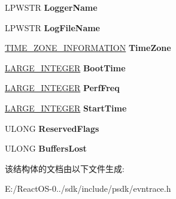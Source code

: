 \begin{DoxyCompactItemize}
\begin{tabbing}
\end{tabbing}\item 
\mbox{\label{struct___t_r_a_c_e___l_o_g_f_i_l_e___h_e_a_d_e_r_adf44a7376b387e730774a45c3e93b437}} 
L\+P\+W\+S\+TR {\bfseries Logger\+Name}
\item 
\mbox{\label{struct___t_r_a_c_e___l_o_g_f_i_l_e___h_e_a_d_e_r_a76705c979d1326fc2b29dad5ba0ca5b6}} 
L\+P\+W\+S\+TR {\bfseries Log\+File\+Name}
\item 
\mbox{\label{struct___t_r_a_c_e___l_o_g_f_i_l_e___h_e_a_d_e_r_ac1ae267367d54f3b047e0cf62a1003e8}} 
\hyperlink{struct___t_i_m_e___z_o_n_e___i_n_f_o_r_m_a_t_i_o_n}{T\+I\+M\+E\+\_\+\+Z\+O\+N\+E\+\_\+\+I\+N\+F\+O\+R\+M\+A\+T\+I\+ON} {\bfseries Time\+Zone}
\item 
\mbox{\label{struct___t_r_a_c_e___l_o_g_f_i_l_e___h_e_a_d_e_r_a8cb4f4830f0569a10a9960ad1a7694b6}} 
\hyperlink{union___l_a_r_g_e___i_n_t_e_g_e_r}{L\+A\+R\+G\+E\+\_\+\+I\+N\+T\+E\+G\+ER} {\bfseries Boot\+Time}
\item 
\mbox{\label{struct___t_r_a_c_e___l_o_g_f_i_l_e___h_e_a_d_e_r_ae0b72b8e15ddf0937a2b42596de884f3}} 
\hyperlink{union___l_a_r_g_e___i_n_t_e_g_e_r}{L\+A\+R\+G\+E\+\_\+\+I\+N\+T\+E\+G\+ER} {\bfseries Perf\+Freq}
\item 
\mbox{\label{struct___t_r_a_c_e___l_o_g_f_i_l_e___h_e_a_d_e_r_a52e93aa9d4f379899235d2933a02e7a1}} 
\hyperlink{union___l_a_r_g_e___i_n_t_e_g_e_r}{L\+A\+R\+G\+E\+\_\+\+I\+N\+T\+E\+G\+ER} {\bfseries Start\+Time}
\item 
\mbox{\label{struct___t_r_a_c_e___l_o_g_f_i_l_e___h_e_a_d_e_r_a1f1eee72502bf3ea1a549585ca012eac}} 
U\+L\+O\+NG {\bfseries Reserved\+Flags}
\item 
\mbox{\label{struct___t_r_a_c_e___l_o_g_f_i_l_e___h_e_a_d_e_r_a9b7939b09593248e5936709a1ef01e50}} 
U\+L\+O\+NG {\bfseries Buffers\+Lost}
\end{DoxyCompactItemize}


该结构体的文档由以下文件生成\+:\begin{DoxyCompactItemize}
\item 
E\+:/\+React\+O\+S-\/0../sdk/include/psdk/evntrace.\+h\end{DoxyCompactItemize}
